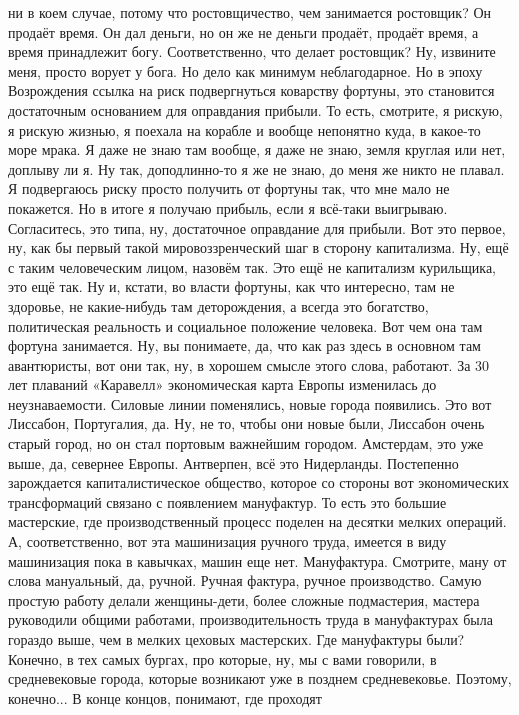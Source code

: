 ни в коем случае, потому что ростовщичество, чем занимается ростовщик? Он
продаёт время. Он дал деньги, но он же не деньги продаёт, продаёт время, а время
принадлежит богу. Соответственно, что делает ростовщик? Ну, извините меня,
просто ворует у бога. Но дело как минимум неблагодарное. Но в эпоху Возрождения
ссылка на риск подвергнуться коварству фортуны, это становится достаточным
основанием для оправдания прибыли. То есть, смотрите, я рискую, я рискую жизнью,
я поехала на корабле и вообще непонятно куда, в какое-то море мрака. Я даже не
знаю там вообще, я даже не знаю, земля круглая или нет, доплыву ли я. Ну так,
доподлинно-то я же не знаю, до меня же никто не плавал. Я подвергаюсь риску
просто получить от фортуны так, что мне мало не покажется. Но в итоге я получаю
прибыль, если я всё-таки выигрываю. Согласитесь, это типа, ну, достаточное
оправдание для прибыли. Вот это первое, ну, как бы первый такой
мировоззренческий шаг в сторону капитализма. Ну, ещё с таким человеческим лицом,
назовём так. Это ещё не капитализм курильщика, это ещё так. Ну и, кстати, во
власти фортуны, как что интересно, там не здоровье, не какие-нибудь там
деторождения, а всегда это богатство, политическая реальность и социальное
положение человека. Вот чем она там фортуна занимается. Ну, вы понимаете, да,
что как раз здесь в основном там авантюристы, вот они так, ну, в хорошем смысле
этого слова, работают. За 30 лет плаваний «Каравелл» экономическая карта Европы
изменилась до неузнаваемости. Силовые линии поменялись, новые города появились.
Это вот Лиссабон, Португалия, да. Ну, не то, чтобы они новые были, Лиссабон
очень старый город, но он стал портовым важнейшим городом. Амстердам, это уже
выше, да, севернее Европы. Антверпен, всё это Нидерланды. Постепенно зарождается
капиталистическое общество, которое со стороны вот экономических трансформаций
связано с появлением мануфактур. То есть это большие мастерские, где
производственный процесс поделен на десятки мелких операций. А, соответственно,
вот эта машинизация ручного труда, имеется в виду машинизация пока в кавычках,
машин еще нет. Мануфактура. Смотрите, ману от слова мануальный, да, ручной.
Ручная фактура, ручное производство. Самую простую работу делали женщины-дети,
более сложные подмастерия, мастера руководили общими работами,
производительность труда в мануфактурах была гораздо выше, чем в мелких цеховых
мастерских. Где мануфактуры были? Конечно, в тех самых бургах, про которые, ну,
мы с вами говорили, в средневековые города, которые возникают уже в позднем
средневековье. Поэтому, конечно... В конце концов, понимают, где проходят

